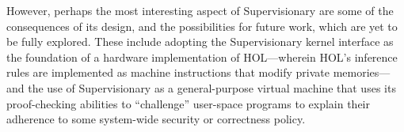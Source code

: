\documentclass[a4paper, UKenglish, cleveref, autoref, thm-restate, colorlinks]{lipics-v2021}
\begin{document}
However, perhaps the most interesting aspect of Supervisionary are some of the consequences of its design, and the possibilities for future work, which are yet to be fully explored.
These include adopting the Supervisionary kernel interface as the foundation of a hardware implementation of HOL---wherein HOL's inference rules are implemented as machine instructions that modify private memories---and the use of Supervisionary as a general-purpose virtual machine that uses its proof-checking abilities to ``challenge'' user-space programs to explain their adherence to some system-wide security or correctness policy.


\end{document}
